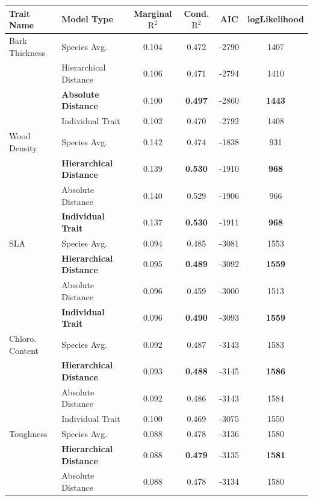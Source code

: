 \begin{table}[!t]
	\begin{center}
		\begin{tabular}{llcccc}
		  \hline
		 Trait Name & Model Type & Marginal $\text{R}^2$ & Cond. $\text{R}^2$ & AIC & logLikelihood \\ 
		  \hline
		Bark Thickness & Species Avg. & 0.104 & 0.472 & -2790 & 1407 \\ 
		            & Hierarchical Distance & 0.106 & 0.471 & -2794 & 1410 \\ 
		            & \textbf{Absolute Distance} & 0.100 & \textbf{0.497} & -2860 & \textbf{1443} \\ 
		            & Individual Trait & 0.102 & 0.470 & -2792 & 1408 \\
		  \cline{2-6}
		  Wood Density & Species Avg. & 0.142 & 0.474 & -1838 & 931 \\ 
		               & \textbf{Hierarchical Distance} & 0.139 & \textbf{0.530} & -1910 & \textbf{968} \\ 
		               & Absolute Distance & 0.140 & 0.529 & -1906 & 966 \\ 
		               & \textbf{Individual Trait} & 0.137 & \textbf{0.530} & -1911 & \textbf{968} \\
		  \cline{2-6}
		  SLA & Species Avg. & 0.094 & 0.485 & -3081 & 1553 \\ 
		      & \textbf{Hierarchical Distance} & 0.095 & \textbf{0.489} & -3092 & \textbf{1559} \\ 
		      & Absolute Distance & 0.096 & 0.459 & -3000 & 1513 \\ 
		      & \textbf{Individual Trait} & 0.096 & \textbf{0.490} & -3093 & \textbf{1559} \\ 
		  \cline{2-6}
		  Chloro. Content & Species Avg. & 0.092 & 0.487 & -3143 & 1583 \\ 
		                  & \textbf{Hierarchical Distance} & 0.093 & \textbf{0.488} & -3145 & \textbf{1586} \\ 
		                  & Absolute Distance & 0.092 & 0.486 & -3143 & 1584 \\ 
		                  & Individual Trait & 0.100 & 0.469 & -3075 & 1550 \\
		  \cline{2-6}	
		  Toughness & Species Avg. & 0.088 & 0.478 & -3136 & 1580 \\ 
		            & \textbf{Hierarchical Distance} & 0.088 & \textbf{0.479} & -3135 & \textbf{1581} \\ 
		            & Absolute Distance & 0.088 & 0.478 & -3134 & 1580 \\ 

\end{tabular}
\end{center}
\end{table}
